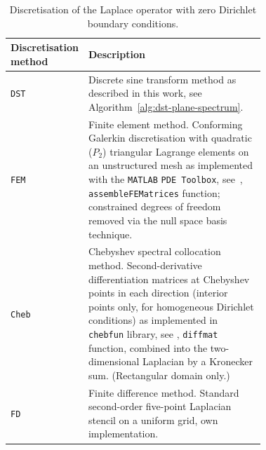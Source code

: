 %

\begin{table}
  \centering
  \begin{tabular}{l p{0.72\linewidth}}
    \toprule
    Discretisation method & Description \\
    \midrule
    \texttt{DST} & Discrete sine transform method as described in this work, see Algorithm~\ref{alg:dst-plane-spectrum}. \\
    \texttt{FEM} & Finite element method. Conforming Galerkin discretisation with quadratic ($P_2$) triangular Lagrange elements on an unstructured mesh as implemented with the \texttt{MATLAB} \texttt{PDE Toolbox}, see~\cite{matlab:r2026a,matlab:pde-toolbox:r2026a}, \lstinline{assembleFEMatrices} function; constrained degrees of freedom removed via the null space basis technique. \\
    \texttt{Cheb} & Chebyshev spectral collocation method. Second-derivative differentiation matrices at Chebyshev points in each direction (interior points only, for homogeneous Dirichlet conditions) as implemented in \texttt{chebfun} library, see \cite{driscoll.ta.hale.n.ea:chebfun}, \lstinline{diffmat} function, combined into the two-dimensional Laplacian by a Kronecker sum. (Rectangular domain only.) \\
    \texttt{FD} & Finite difference method. Standard second-order five-point Laplacian stencil on a uniform grid, own implementation. \\
    \bottomrule
  \end{tabular}
  \caption{Discretisation of the Laplace operator with zero Dirichlet boundary conditions.}
  \label{tab:methods_description}
\end{table}
